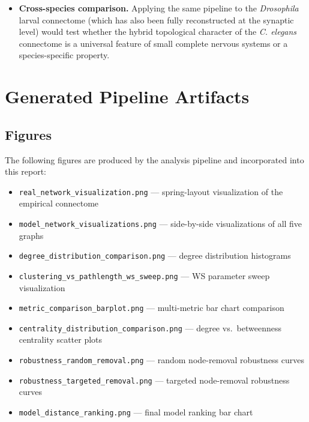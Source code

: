 \documentclass[12pt,a4paper]{report}
\begin{document}
\begin{itemize}
    \item \textbf{Cross-species comparison.} Applying the same pipeline to the \textit{Drosophila} larval connectome (which has also been fully reconstructed at the synaptic level) would test whether the hybrid topological character of the \textit{C. elegans} connectome is a universal feature of small complete nervous systems or a species-specific property.
\end{itemize}

\appendix
\chapter{Generated Pipeline Artifacts}

\section{Figures}

The following figures are produced by the analysis pipeline and incorporated into this report:

\begin{itemize}
    \item \texttt{real\_network\_visualization.png} — spring-layout visualization of the empirical connectome
    \item \texttt{model\_network\_visualizations.png} — side-by-side visualizations of all five graphs
    \item \texttt{degree\_distribution\_comparison.png} — degree distribution histograms
    \item \texttt{clustering\_vs\_pathlength\_ws\_sweep.png} — WS parameter sweep visualization
    \item \texttt{metric\_comparison\_barplot.png} — multi-metric bar chart comparison
    \item \texttt{centrality\_distribution\_comparison.png} — degree vs.\ betweenness centrality scatter plots
    \item \texttt{robustness\_random\_removal.png} — random node-removal robustness curves
    \item \texttt{robustness\_targeted\_removal.png} — targeted node-removal robustness curves
    \item \texttt{model\_distance\_ranking.png} — final model ranking bar chart
\end{itemize}
\end{document}
